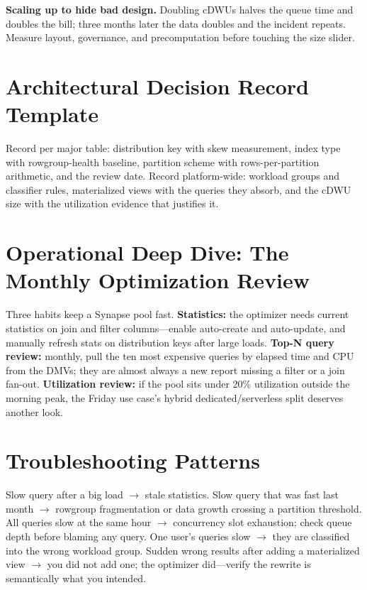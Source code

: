 \begin{pitfall}
\textbf{Scaling up to hide bad design.} Doubling cDWUs halves the queue time and doubles the bill; three months later the data doubles and the incident repeats. Measure layout, governance, and precomputation before touching the size slider.
\end{pitfall}

\section{Architectural Decision Record Template}
Record per major table: distribution key with skew measurement, index type with rowgroup-health baseline, partition scheme with rows-per-partition arithmetic, and the review date. Record platform-wide: workload groups and classifier rules, materialized views with the queries they absorb, and the cDWU size with the utilization evidence that justifies it.

\section{Operational Deep Dive: The Monthly Optimization Review}
Three habits keep a Synapse pool fast. \textbf{Statistics:} the optimizer needs current statistics on join and filter columns---enable auto-create and auto-update, and manually refresh stats on distribution keys after large loads. \textbf{Top-N query review:} monthly, pull the ten most expensive queries by elapsed time and CPU from the DMVs; they are almost always a new report missing a filter or a join fan-out. \textbf{Utilization review:} if the pool sits under 20\% utilization outside the morning peak, the Friday use case's hybrid dedicated/serverless split deserves another look.

\section{Troubleshooting Patterns}
Slow query after a big load $\rightarrow$ stale statistics. Slow query that was fast last month $\rightarrow$ rowgroup fragmentation or data growth crossing a partition threshold. All queries slow at the same hour $\rightarrow$ concurrency slot exhaustion; check queue depth before blaming any query. One user's queries slow $\rightarrow$ they are classified into the wrong workload group. Sudden wrong results after adding a materialized view $\rightarrow$ you did not add one; the optimizer did---verify the rewrite is semantically what you intended.


